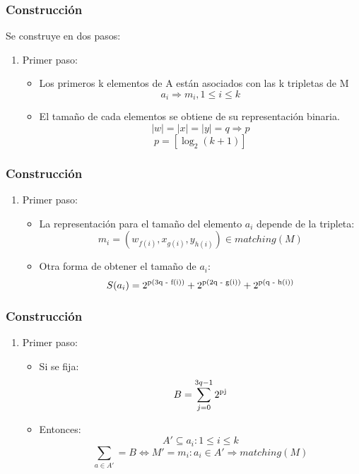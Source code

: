 \documentclass{beamer}
\begin{document}

\begin{frame}
\frametitle{Construcci\'on}
Se construye en dos pasos:
\begin{enumerate}
\item Primer paso:
\begin{itemize}
\item Los primeros k elementos de A est\'an asociados con las k tripletas de M
	  $$ a_{i} \Rightarrow m_{i}, 1 \leq i \leq k $$
\item El tama\~{n}o de cada elementos se obtiene de su representaci\'on binaria.
	  $$ |w| = |x| = |y| = q \Rightarrow p $$
      $$p = [\log_2(k + 1)]$$
\end{itemize}

\end{enumerate}

\end{frame}


\begin{frame}
\frametitle{Construcci\'on}
\begin{enumerate}
\item Primer paso:
\begin{itemize}
\item La representaci\'on para el tama\~{n}o del elemento $a_{i}$ depende de la tripleta:
	$$m_{i} = (w_{f(i)}, x_{g(i)}, y_{h(i)}) \in matching(M)$$
\item Otra forma de obtener el tama\~{n}o de $a_{i}$:
	$$S(a_{i}) = 2\textsuperscript{p(3q - f(i))} + 2\textsuperscript{p(2q - g(i))} + 2\textsuperscript{p(q - h(i))}$$
\end{itemize}

\end{enumerate}

\end{frame}


\begin{frame}
\frametitle{Construcci\'on}
\begin{enumerate}
\item Primer paso:
\begin{itemize}
\item Si se fija:
	$$B = \sum\limits_{j=0}^{3q -1} 2\textsuperscript{pj}$$
\item Entonces:
	$$A'\subseteq {a_{i}: 1 \leq i \leq k}$$
    $$\sum\limits_{a\in A'} = B \iff M' = {m_{i}: a_{i} \in A' \Rightarrow matching(M)}$$
\end{itemize}

\end{enumerate}

\end{frame}
\end{document}
